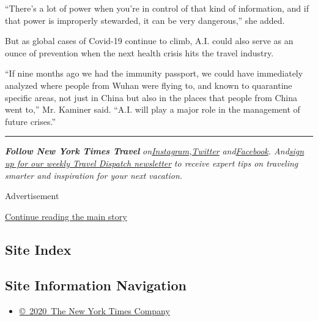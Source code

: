 ``There's a lot of power when you're in control of that kind of
information, and if that power is improperly stewarded, it can be very
dangerous,'' she added.

But as global cases of Covid-19 continue to climb, A.I. could also serve
as an ounce of prevention when the next health crisis hits the travel
industry.

``If nine months ago we had the immunity passport, we could have
immediately analyzed where people from Wuhan were flying to, and known
to quarantine specific areas, not just in China but also in the places
that people from China went to,'' Mr. Kaminer said. ``A.I. will play a
major role in the management of future crises.''

\begin{center}\rule{0.5\linewidth}{\linethickness}\end{center}

\emph{\textbf{Follow New York Times Travel}}
\emph{on}\href{https://www.instagram.com/nytimestravel/}{\emph{Instagram}}\emph{,}\href{https://twitter.com/nytimestravel}{\emph{Twitter}}
\emph{and}\href{https://www.facebook.com/nytimestravel/}{\emph{Facebook}}\emph{.
And}\href{https://www.nytimes.com/newsletters/traveldispatch}{\emph{sign
up for our weekly Travel Dispatch newsletter}} \emph{to receive expert
tips on traveling smarter and inspiration for your next vacation.}

Advertisement

\protect\hyperlink{after-bottom}{Continue reading the main story}

\hypertarget{site-index}{%
\subsection{Site Index}\label{site-index}}

\hypertarget{site-information-navigation}{%
\subsection{Site Information
Navigation}\label{site-information-navigation}}

\begin{itemize}
\tightlist
\item
  \href{https://help.nytimes.com/hc/en-us/articles/115014792127-Copyright-notice}{©~2020~The
  New York Times Company}
\end{itemize}

